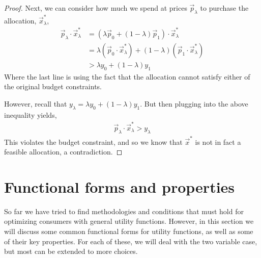 \begin{description}
\begin{proof}
        Next, we can consider how much we spend at prices $\vec{p}_\lambda$ to purchase the allocation, $\vec{x}^*_\lambda$,
        \begin{align*}
            \vec{p}_\lambda \cdot \vec{x}^*_\lambda &= (\lambda \vec{p}_0 + (1 - \lambda) \vec{p}_1) \cdot \vec{x}^*_\lambda \\
            &= \lambda (\vec{p}_0 \cdot \vec{x}^*_\lambda) + (1 - \lambda) (\vec{p}_1 \cdot \vec{x}^*_\lambda) \\
            &> \lambda y_0 + (1 - \lambda) y_1
        \end{align*}
        Where the last line is using the fact that the allocation cannot satisfy either of the original budget constraints. 

        However, recall that $y_\lambda = \lambda y_0 + (1 - \lambda)y_1$. But then plugging into the above inequality yields,
        \begin{align*}
            \vec{p}_\lambda \cdot \vec{x}^*_\lambda > y_\lambda
        \end{align*}
        This violates the budget constraint, and so we know that $\vec{x}^*$ is not in fact a feasible allocation, a contradiction. 
    \end{proof}
\end{description}

\section{Functional forms and properties}
So far we have tried to find methodologies and conditions that must hold for optimizing consumers with general utility functions. However, in this section we will discuss some common functional forms for utility functions, as well as some of their key properties. For each of these, we will deal with the two variable case, but most can be extended to more choices. 

